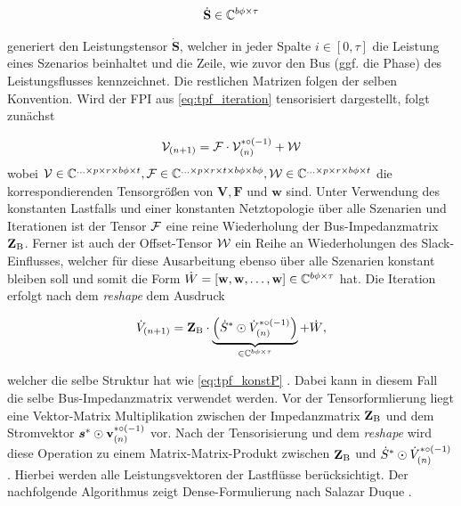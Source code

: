 \begin{equation}
	\dot{\mathbf{S}} \in \mathbb{C}^{b\phi \times \tau}
	\label{eq:reshape}
\end{equation}

generiert den Leistungstensor $\dot{\mathbf{S}}$, welcher in jeder Spalte $i \in \left[0, \tau \right]$ die Leistung eines Szenarios beinhaltet und die Zeile, wie zuvor den Bus (ggf. die Phase) des Leistungsflusses kennzeichnet.
Die restlichen Matrizen folgen der selben Konvention.
Wird der FPI aus \eqref{eq:tpf_iteration} tensorisiert dargestellt, folgt zunächst

\begin{equation}
	\mathcal{V}_{(n+1)} = \mathcal{F} \cdot \mathcal{V}_{(n)}^{*{\circ(-1)}} + \mathcal{W}
	\label{eq:tensor_fpi}
\end{equation}
wobei $\mathcal{V} \in \mathbb{C}^{\ldots \times p \times r \times b\phi \times t}, \mathcal{F} \in \mathbb{C}^{\ldots \times p \times r \times t \times b\phi \times b\phi}, \mathcal{W} \in \mathbb{C}^{\ldots \times p \times r \times b\phi \times t}$ die korrespondierenden Tensorgrößen von $\mathbf{V}, \mathbf{F}$ und $\mathbf{w}$ sind.
Unter Verwendung des konstanten Lastfalls und einer konstanten Netztopologie über alle Szenarien und Iterationen ist der Tensor $\mathcal{F}$ eine reine Wiederholung der Bus-Impedanzmatrix $\mathbf{Z}_\mathrm{B}$. 
Ferner ist auch der Offset-Tensor $\mathcal{W}$ ein Reihe an Wiederholungen des Slack-Einflusses, welcher für diese Ausarbeitung ebenso über alle Szenarien konstant bleiben soll und somit die Form $\dot{W} = [\mathbf{w}, \mathbf{w}, \ldots, \mathbf{w}] \in \mathbb{C}^{b\phi \times \tau}$ hat.
Die Iteration erfolgt nach dem \emph{reshape} dem Ausdruck


\begin{equation}
	\dot{V}_{(n+1)} = \mathbf{Z}_\mathrm{B} \cdot \underbrace{\left(\dot{S}^* \odot \dot{V}_{(n)}^{*{\circ(-1)}}\right)}_{\in \mathbb{C}^{b\phi \times \tau}} + \dot{W},
	\label{eq:dense_matmul}
\end{equation}

welcher die selbe Struktur hat wie \eqref{eq:tpf_konstP} \cite{Salazar2024}.
Dabei kann in diesem Fall die selbe Bus-Impedanzmatrix verwendet werden.
Vor der Tensorformlierung liegt eine Vektor-Matrix Multiplikation zwischen der Impedanzmatrix $\mathbf{Z}_\mathrm{B}$ und dem Stromvektor $\boldsymbol{s}^* \odot \mathbf{v}_{(n)}^{*{\circ(-1)}}$ vor. 
Nach der Tensorisierung und dem \emph{reshape} wird diese Operation zu einem Matrix-Matrix-Produkt zwischen $\mathbf{Z}_\mathrm{B}$ und $\dot{S}^* \odot \dot{V}_{(n)}^{*{\circ(-1)}}$.
Hierbei werden alle Leistungsvektoren der Lastflüsse berücksichtigt.
Der nachfolgende Algorithmus zeigt Dense-Formulierung nach Salazar Duque \cite{Salazar2024}.




